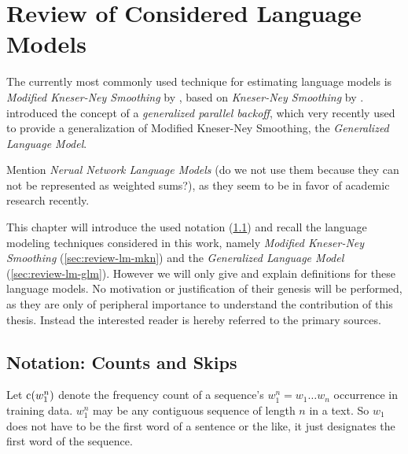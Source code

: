 \chapter{Review of Considered Language Models}
\label{ch:review}

The currently most commonly used \parencite{JurafskyMartin2009,Chelba2013}
technique for estimating language models is \emph{Modified Kneser-Ney Smoothing}
by \textcite{ChenGoodman1996,ChenGoodman1998,ChenGoodman1999}, based on
\emph{Kneser-Ney Smoothing} by \textcite{KneserNey1995}.
\textcite{BilmesKirchhoff2003} introduced the concept of a \emph{generalized
parallel backoff}, which very recently \textcite{Pickhardt2014} used to provide
a generalization of Modified Kneser-Ney Smoothing, the \emph{Generalized
Language Model}.

\begin{draft}
Mention \emph{Nerual Network Language Models} \parencite{Bengio2003,Mikolov2012}
(do we not use them because they can not be represented as weighted sums?), as
they seem to be in favor of academic research recently.
\end{draft}

This chapter will introduce the used notation (\cref{sec:review-notation})
and recall the language modeling techniques considered in this work,
namely \emph{Modified Kneser-Ney Smoothing} (\cref{sec:review-lm-mkn}) and the
\emph{Generalized Language Model} (\cref{sec:review-lm-glm}).
However we will only give and explain definitions for these language models.
No motivation or justification of their genesis will be performed, as they are
only of peripheral importance to understand the contribution of this thesis.
Instead the interested reader is hereby referred to the primary sources.


\section{Notation: Counts and Skips}
\label{sec:review-notation}

Let $\operatorname{c}(w_1^n)$ denote the frequency count of a sequence's
$w_1^n = w_1 \ldots w_n$ occurrence in training data.
$w_1^n$ may be any contiguous sequence of length $n$ in a text.
So $w_1$ does not have to be the first word of a sentence or the like,
it just designates the first word of the sequence.


